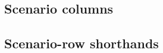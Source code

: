 \subsection{Scenario columns}           \label{mxp_v3: columns: scenario: columns}        
\subsection{Scenario-row shorthands}    \label{mxp_v3: columns: scenario: shorthands}     

